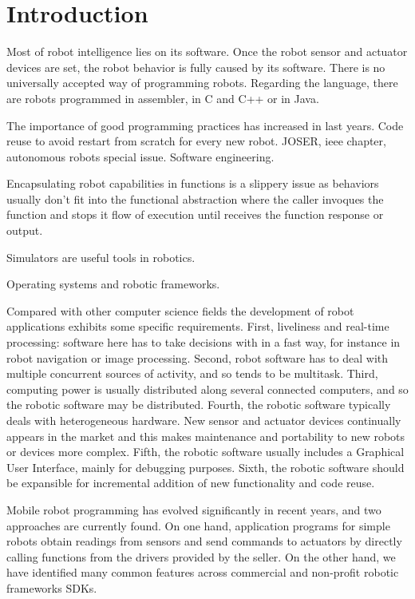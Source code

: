 \documentclass[twocolumn]{svjour3}          %
\begin{document}
\section{Introduction}
\label{intro}

Most of robot intelligence lies on its software. Once the robot sensor
and actuator devices are set, the robot behavior is fully caused by
its software. There is no universally accepted way of programming
robots. Regarding the language, there are robots programmed in assembler, in C and C++ or in Java. 

The importance of good programming practices has increased in last years. Code reuse to avoid restart from scratch for every new robot. JOSER, ieee chapter, autonomous robots special issue. Software engineering.

Encapsulating robot capabilities in functions is a slippery issue as behaviors usually don't fit into the functional abstraction where the caller invoques the function and stops it flow of execution until receives the function response or output.

Simulators are useful tools in robotics.

Operating systems and robotic frameworks.

Compared with other computer science fields the development of robot applications exhibits some specific requirements. First, liveliness and real-time processing: software here has to take decisions with in a fast way, for instance in robot navigation or image processing. Second, robot software has to deal with multiple concurrent sources of activity, and so tends to be multitask. Third, computing power is usually distributed along several connected computers, and so the robotic software may be distributed. Fourth, the robotic software typically deals with heterogeneous hardware. New sensor and actuator devices continually appears in the market and this makes maintenance and portability to new robots or devices more complex. Fifth, the robotic software usually includes a Graphical User Interface, mainly for debugging purposes. Sixth, the robotic software should be expansible for incremental addition of new functionality and code reuse.

Mobile robot programming has evolved significantly in recent years, and two approaches are currently found. On one hand, application programs for simple robots obtain readings from sensors and send commands to actuators by directly calling functions from the drivers provided by the seller. On the other hand, we have identified many common features across commercial and non-profit robotic frameworks SDKs.
\end{document}

